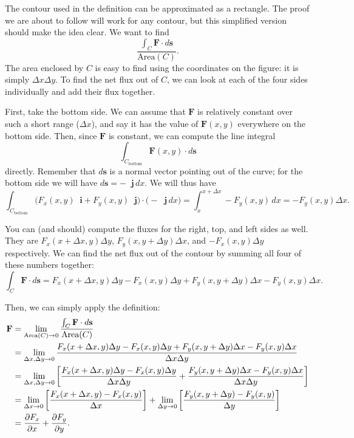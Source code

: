 \documentclass{myarticle}
\let\div\relax %
\DeclareMathOperator{\div}{div}
\renewcommand{\vec}[1]{\mathbf{#1}}
\newcommand{\unitvector}[1]{
  \mathop{}\!\vec{#1}
}
\newcommand{\ih}{\unitvector{i}}
\newcommand{\jh}{\unitvector{j}}
\theoremstyle{nospace}
\newtheorem{old series theorem}{Theorem}
\newenvironment{series theorem}
{\begin{mdframed}\begin{old series theorem}}
    {\end{old series theorem}\end{mdframed}}
\begin{document}
The contour used in the definition can be approximated as a rectangle.
The proof we are about to follow will work for any contour, but this
simplified version should make the idea clear. We want to find
\[
  \frac{\int_C \vec{F} \cdot d\vec{s}}{\text{Area}(C)}.
\]
The area enclosed by $C$ is easy to find using the coordinates on the
figure: it is simply $\Delta x \Delta y$. To find the net flux out of
$C$, we can look at each of the four sides individually and add their
flux together.

First, take the bottom side. We can assume that $\vec{F}$ is
relatively constant over such a short range ($\Delta x$), and say it
has the value of $\vec{F}(x, y)$ everywhere on the bottom side. Then,
since $\vec{F}$ is constant, we can compute the line integral
\[
  \int_{C_\text{bottom}} \vec{F}(x, y) \cdot d\vec{s}
\]
directly. Remember that $d\vec{s}$ is a normal vector pointing out of
the curve; for the bottom side we will have $d\vec{s} = -\jh \,dx$. We
will thus have
\[
  \int_{C_\text{bottom}} \big(F_x(x, y) \ih + F_y(x, y) \jh\big)
  \cdot \big(-\jh \,dx\big)
  = \int_x^{x + \Delta x} -F_y(x, y) \,dx
  = -F_y(x, y) \Delta x.
\]

You can (and should) compute the fluxes for the right, top, and left
sides as well. They are $F_x(x + \Delta x, y) \Delta y$,
$F_y(x, y + \Delta y) \Delta x$, and $-F_x(x, y) \Delta y$
respectively. We can find the net flux out of the contour by summing
all four of these numbers together:
\[
  \int_C \vec{F} \cdot d\vec{s}
  = F_x(x + \Delta x, y)\Delta y
  - F_x(x, y)\Delta y
  + F_y(x, y + \Delta y)\Delta x
  - F_y(x, y)\Delta x.
\]

Then, we can simply apply the definition:
\begin{align*}
  \div \vec{F}
  &= \lim_{\text{Area}(C) \to 0}
    \frac{\int_C \vec{F} \cdot d\vec{s}}{\text{Area}(C)} \\
  &= \lim_{\Delta x, \Delta y \to 0}
    \frac{
    F_x(x + \Delta x, y)\Delta y -
    F_x(x, y)\Delta y +
    F_y(x, y + \Delta y)\Delta x -
    F_y(x, y)\Delta x}
    {\Delta x \Delta y} \\
  &= \lim_{\Delta x, \Delta y \to 0}
    \left[\frac{
    F_x(x + \Delta x, y)\Delta y -
    F_x(x, y)\Delta y}
    {\Delta x \Delta y} +
    \frac{F_y(x, y + \Delta y)\Delta x -
    F_y(x, y)\Delta x}
    {\Delta x \Delta y}\right] \\
  &= \lim_{\Delta x \to 0}
    \left[\frac{
    F_x(x + \Delta x, y) -
    F_x(x, y)}
    {\Delta x}\right] +
    \lim_{\Delta y \to 0}
    \left[\frac{
    F_y(x, y + \Delta y) -
    F_y(x, y)}
    {\Delta y}\right] \\
  &= \frac{\partial F_x}{\partial x}
    + \frac{\partial F_y}{\partial y}.
\end{align*}
\end{document}
